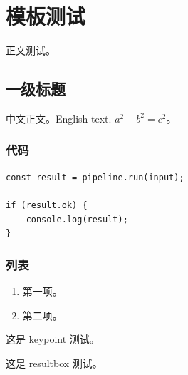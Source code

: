 \documentclass{biomed-report}
\begin{document}
\makereporttitle

\frontmatter

\chapter{模板测试}

正文测试。

\section{一级标题}

中文正文。English text. \(a^2+b^2=c^2\)。

\subsection{代码}

\begin{lstlisting}
const result = pipeline.run(input);

if (result.ok) {
    console.log(result);
}
\end{lstlisting}

\subsection{列表}

\begin{enumerate}
  \item 第一项。
  \item 第二项。
\end{enumerate}

\begin{keypoint}[核心要点]
这是 keypoint 测试。
\end{keypoint}

\begin{resultbox}[关键结果]
这是 resultbox 测试。
\end{resultbox}
\end{document}
